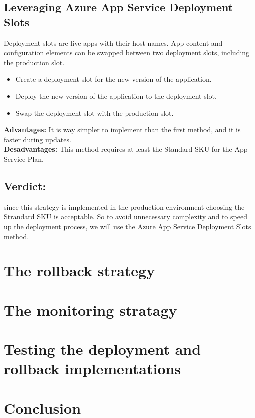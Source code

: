 \subsection*{Leveraging Azure App Service Deployment Slots}
Deployment slots are live apps with their host names. App content and configuration elements can be swapped between two deployment slots, including the production slot.
\begin{itemize}
    \item Create a deployment slot for the new version of the application.
    \item Deploy the new version of the application to the deployment slot.
    \item Swap the deployment slot with the production slot.
\end{itemize}
\textbf{Advantages:} It is way simpler to implement than the first method, and it is faster during updates.
\\
\textbf{Desadvantages:} This method requires at least the Standard SKU for the App Service Plan.
\subsection*{Verdict:}
since this strategy is implemented in the production environment choosing the Strandard SKU is acceptable. So to avoid unnecessary complexity and to speed up the deployment process, we will use the Azure App Service Deployment Slots method.
\section{The rollback strategy}
\section{The monitoring stratagy}
\section{Testing the deployment and rollback implementations}
\section*{Conclusion}
